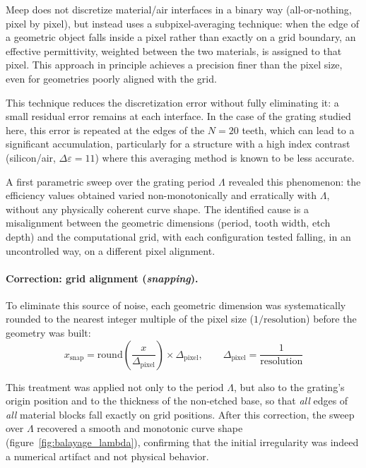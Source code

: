 \documentclass[a4paper,11pt]{report}
\begin{document}
Meep does not discretize material/air interfaces in a binary way (all-or-nothing, pixel by pixel), but instead uses a subpixel-averaging technique: when the edge of a geometric object falls inside a pixel rather than exactly on a grid boundary, an effective permittivity, weighted between the two materials, is assigned to that pixel. This approach in principle achieves a precision finer than the pixel size, even for geometries poorly aligned with the grid.

This technique reduces the discretization error without fully eliminating it: a small residual error remains at each interface. In the case of the grating studied here, this error is repeated at the edges of the $N=20$ teeth, which can lead to a significant accumulation, particularly for a structure with a high index contrast (silicon/air, $\Delta\varepsilon=11$) where this averaging method is known to be less accurate.

A first parametric sweep over the grating period $\Lambda$ revealed this phenomenon: the efficiency values obtained varied non-monotonically and erratically with $\Lambda$, without any physically coherent curve shape. The identified cause is a misalignment between the geometric dimensions (period, tooth width, etch depth) and the computational grid, with each configuration tested falling, in an uncontrolled way, on a different pixel alignment.

\paragraph{Correction: grid alignment (\emph{snapping}).} To eliminate this source of noise, each geometric dimension was systematically rounded to the nearest integer multiple of the pixel size ($1/\text{resolution}$) before the geometry was built:
\begin{equation}
x_{\text{snap}} = \text{round}\left(\frac{x}{\Delta_{\text{pixel}}}\right)\times\Delta_{\text{pixel}}, \qquad \Delta_{\text{pixel}}=\frac{1}{\text{resolution}}
\label{eq:snap}
\end{equation}

This treatment was applied not only to the period $\Lambda$, but also to the grating's origin position and to the thickness of the non-etched base, so that \emph{all} edges of \emph{all} material blocks fall exactly on grid positions. After this correction, the sweep over $\Lambda$ recovered a smooth and monotonic curve shape (figure~\ref{fig:balayage_lambda}), confirming that the initial irregularity was indeed a numerical artifact and not physical behavior.
\end{document}

